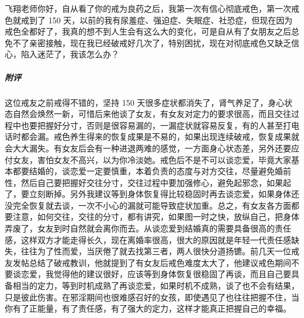 \begin{case}
    飞翔老师你好，自从看了你的戒为良药之后，我第一次有信心彻底戒色，第一次戒色就戒到了 150 天，以前的我有尿羞症、强迫症、失眠症、社恐症，但现在因为戒色全都好了，我真的想不到人生会有这么大的变化，可是自从有了女朋友之后总免不了亲密接触，现在我已经破戒好几次了，特别困扰，现在对彻底戒色又缺乏信心，陷入迷茫了，我该怎么办？
    \subparagraph{附评} 这位戒友之前戒得不错的，坚持 150 天很多症状都消失了，肾气养足了，身心状态自然会焕然一新，可惜后来他谈了女友，有女友对定力的要求很高，而且交往过程中也要把握好分寸，否则是很容易漏的，一漏症状就容易反复，有的人甚至打电话时都会漏。戒色养生得来的恢复成果是不易的，如果出现连续破戒，恢复成果就会大大漏失。有女友后会有一种进退两难的感觉，一方面身心状态差，另外还要应付女友，害怕女友不高兴，以为你冷淡她。戒色后不是不可以谈恋爱，毕竟大家基本都要结婚的，谈恋爱一定要慎重，本着负责的态度与对方交往，尽量避免婚前性，然后自己要把握好交往分寸，交往过程中要加强修心，避免起邪念，如果起了，要立刻断掉。另外我建议等到身体恢复得比较稳固时再去谈恋爱，如果身体还没完全恢复就去谈，一次不小心的漏就可能导致症状加重。总之，有女友各方面都要注意，如何交往，交往的分寸，都有讲究，如果图一时之快，放纵自己，把身体弄废了，女友到时自然就会离你而去。从谈恋爱到结婚真的需要具备很高的责任感，这样双方才能走得长久，现在离婚率很高，很大的原因就是年轻一代责任感缺失，往往为了性而爱，当厌倦了就去找第三者，两人很快分道扬镳。前几天一位戒友发帖总结了破戒教训，他就提到了有女友后戒色难度太大了，他建议戒色期间不要谈恋爱，我觉得他的建议很好，应该等到身体恢复很稳固了再谈，而且自己要具备相当的定力，等到时机成熟了再谈恋爱，如果时机不成熟，谈了也不会有结果，只是彼此伤害。在邪淫期间也很难感召好的女孩，即使遇见了也往往把握不住，当你有了正能量，有了责任感，有了强大的定力，这样才能真正把握自己的幸福。
\end{case}

